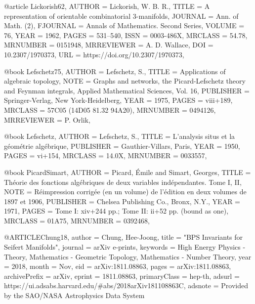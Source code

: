 @article {Lickorish62,
    AUTHOR = {Lickorish, W. B. R.},
     TITLE = {A representation of orientable combinatorial {$3$}-manifolds},
   JOURNAL = {Ann. of Math. (2)},
  FJOURNAL = {Annals of Mathematics. Second Series},
    VOLUME = {76},
      YEAR = {1962},
     PAGES = {531--540},
      ISSN = {0003-486X},
   MRCLASS = {54.78},
  MRNUMBER = {0151948},
MRREVIEWER = {A. D. Wallace},
       DOI = {10.2307/1970373},
       URL = {https://doi.org/10.2307/1970373},
}

@book {Lefschetz75,
    AUTHOR = {Lefschetz, S.},
     TITLE = {Applications of algebraic topology},
      NOTE = {Graphs and networks, the Picard-Lefschetz theory and Feynman
              integrals,
              Applied Mathematical Sciences, Vol. 16},
 PUBLISHER = {Springer-Verlag, New York-Heidelberg},
      YEAR = {1975},
     PAGES = {viii+189},
   MRCLASS = {57C05 (14D05 81.32 94A20)},
  MRNUMBER = {0494126},
MRREVIEWER = {P. Orlik},
}

@book {Lefschetz,
    AUTHOR = {Lefschetz, S.},
     TITLE = {L'analysis situs et la g\'{e}om\'{e}trie alg\'{e}brique},
 PUBLISHER = {Gauthier-Villars, Paris},
      YEAR = {1950},
     PAGES = {vi+154},
   MRCLASS = {14.0X},
  MRNUMBER = {0033557},
}

@book {PicardSimart,
    AUTHOR = {Picard, \'{E}mile and Simart, Georges},
     TITLE = {Th\'{e}orie des fonctions alg\'{e}briques de deux variables
              ind\'{e}pendantes. {T}ome {I}, {II}},
      NOTE = {R\'{e}impression corrig\'{e}e (en un volume) de l'\'{e}dition en deux
              volumes de 1897 et 1906},
 PUBLISHER = {Chelsea Publishing Co., Bronx, N.Y.},
      YEAR = {1971},
     PAGES = {Tome I: xiv+244 pp.; Tome II: ii+52 pp. (bound as one)},
   MRCLASS = {01A75},
  MRNUMBER = {0392468},
}

@ARTICLE{Chung18,
       author = {{Chung}, Hee-Joong},
        title = "{BPS Invariants for Seifert Manifolds}",
      journal = {arXiv e-prints},
     keywords = {High Energy Physics - Theory, Mathematics - Geometric Topology,
        Mathematics - Number Theory},
         year = 2018,
        month = Nov,
          eid = {arXiv:1811.08863},
        pages = {arXiv:1811.08863},
archivePrefix = {arXiv},
       eprint = {1811.08863},
 primaryClass = {hep-th},
       adsurl = {https://ui.adsabs.harvard.edu/#abs/2018arXiv181108863C},
      adsnote = {Provided by the SAO/NASA Astrophysics Data System}
}



